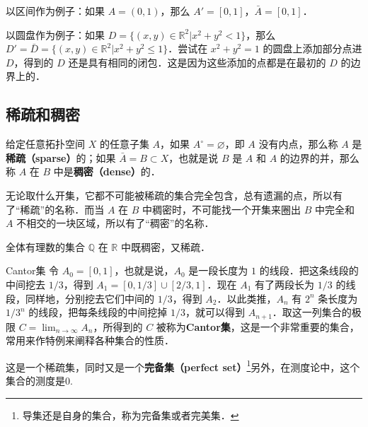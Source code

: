 以区间作为例子：如果 $A=(0,1)$，那么 $A'=[0,1]$，$\bar{A}=[0,1]$．

以圆盘作为例子：如果 $D=\{(x,y)\in\mathbb{R}^2|x^2+y^2<1\}$，那么 $D'=\bar{D}=\{(x,y)\in\mathbb{R}^2|x^2+y^2\leq1\}$．尝试在 $x^2+y^2=1$ 的圆盘上添加部分点进 $D$，得到的 $D$ 还是具有相同的闭包．这是因为这些添加的点都是在最初的 $D$ 的边界上的．

\subsection{稀疏和稠密}
给定任意拓扑空间 $X$ 的任意子集 $A$，如果 $A^\circ=\varnothing$，即 $A$ 没有内点，那么称 $A$ 是\textbf{稀疏（sparse）}的；如果 $\bar{A}=B\subset X$，也就是说 $B$ 是 $A$ 和 $A$ 的边界的并，那么称 $A$ 在 $B$ 中是\textbf{稠密（dense）}的．

无论取什么开集，它都不可能被稀疏的集合完全包含，总有遗漏的点，所以有了“稀疏”的名称．而当 $A$ 在 $B$ 中稠密时，不可能找一个开集来圈出 $B$ 中完全和 $A$ 不相交的一块区域，所以有了“稠密”的名称．

全体有理数的集合 $\mathbb{Q}$ 在 $\mathbb{R}$ 中既稠密，又稀疏．

\begin{example}{Cantor集}\label{Topo0_ex2}
令 $A_0=[0,1]$，也就是说，$A_0$ 是一段长度为 $1$ 的线段．把这条线段的中间挖去 $1/3$，得到 $A_1=[0,1/3]\cup[2/3,1]$．现在 $A_1$ 有了两段长为 $1/3$ 的线段，同样地，分别挖去它们中间的 $1/3$，得到 $A_2$．以此类推，$A_n$ 有 $2^n$ 条长度为 $1/3^n$ 的线段，把每条线段的中间挖掉 $1/3$，就可以得到 $A_{n+1}$．取这一列集合的极限 $C=\lim_{n\rightarrow\infty}A_n$，所得到的 $C$ 被称为\textbf{Cantor集}，这是一个非常重要的集合，常用来作特例来阐释各种集合的性质．

这是一个稀疏集，同时又是一个\textbf{完备集（perfect set）}\footnote{导集还是自身的集合，称为完备集或者完美集．}另外，在测度论中，这个集合的测度是0. 
\end{example}
